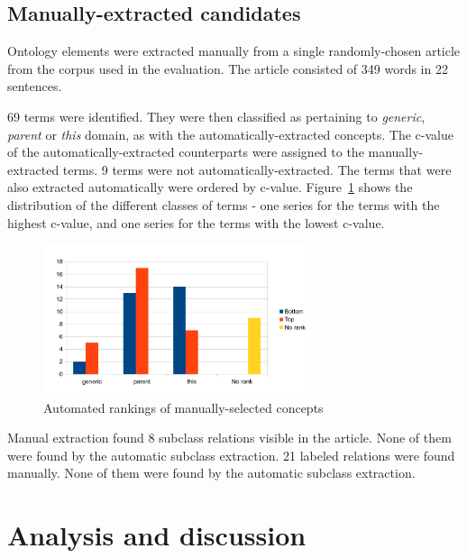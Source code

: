 \documentclass[a4paper]{report}
\begin{document}
\subsection{Manually-extracted candidates}

Ontology elements were extracted manually from a single randomly-chosen article from the corpus used in the evaluation.
The article consisted of 349 words in 22 sentences.

69 terms were identified.
They were then classified as pertaining to \emph{generic}, \emph{parent} or \emph{this} domain, as with the automatically-extracted concepts.
The c-value of the automatically-extracted counterparts were assigned to the manually-extracted terms.
9 terms were not automatically-extracted.
The terms that were also extracted automatically were ordered by c-value.
Figure~\ref{fig:concepts-manual} shows the distribution of the different classes of terms - one series for the terms with the highest c-value, and one series for the terms with the lowest c-value.

\begin{figure}
  \centering
  \includegraphics[width=0.7\textwidth]{graphics/concepts-manual}
  \caption{Automated rankings of manually-selected concepts}
  \label{fig:concepts-manual}
\end{figure}

Manual extraction found 8 subclass relations visible in the article.
None of them were found by the automatic subclass extraction.
21 labeled relations were found manually.
None of them were found by the automatic subclass extraction.

\section{Analysis and discussion}
\label{sec:analysis}

\end{document}
